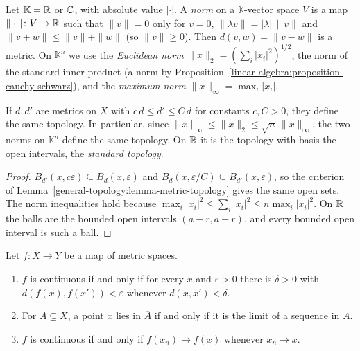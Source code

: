 \begin{definition}\label{general-topology:definition-normed-space}
Let $\mathbb{K} = \mathbb{R}$ or $\mathbb{C}$, with absolute value $|\cdot|$. A \emph{norm} on a $\mathbb{K}$-vector space $V$ is a map
$\| \cdot \| \colon V \to \mathbb{R}$ such that $\|v\| = 0$ only for $v = 0$, $\|\lambda v\| = |\lambda|\,\|v\|$ and $\|v + w\| \leq \|v\| + \|w\|$
(so $\|v\| \geq 0$). Then $d(v, w) = \|v - w\|$ is a metric. On $\mathbb{K}^n$ we use the \emph{Euclidean norm}
$\|x\|_2 = (\sum_i |x_i|^2)^{1/2}$, the norm of the standard inner product (a norm by
Proposition~\ref{linear-algebra:proposition-cauchy-schwarz}), and the \emph{maximum norm} $\|x\|_\infty = \max_i |x_i|$.
\end{definition}

\begin{lemma}\label{general-topology:lemma-equivalent-metrics}
If $d, d'$ are metrics on $X$ with $c\,d \leq d' \leq C\,d$ for constants $c, C > 0$, they define the same topology. In particular, since
$\|x\|_\infty \leq \|x\|_2 \leq \sqrt{n}\,\|x\|_\infty$, the two norms on $\mathbb{K}^n$ define the same topology. On $\mathbb{R}$ it is the topology with
basis the open intervals, the \emph{standard topology}.
\end{lemma}

\begin{proof}
$B_{d'}(x, c\varepsilon) \subseteq B_d(x, \varepsilon)$ and $B_d(x, \varepsilon/C) \subseteq B_{d'}(x, \varepsilon)$, so the criterion of
Lemma~\ref{general-topology:lemma-metric-topology} gives the same open sets. The norm inequalities hold because
$\max_i |x_i|^2 \leq \sum_i |x_i|^2 \leq n \max_i |x_i|^2$. On $\mathbb{R}$ the balls are the bounded open intervals $(a - r, a + r)$, and every bounded
open interval is such a ball.
\end{proof}

\begin{proposition}\label{general-topology:proposition-metric-continuity}
Let $f \colon X \to Y$ be a map of metric spaces.
\begin{enumerate}
\item $f$ is continuous if and only if for every $x$ and $\varepsilon > 0$ there is $\delta > 0$ with $d(f(x), f(x')) < \varepsilon$ whenever
$d(x, x') < \delta$.
\item For $A \subseteq X$, a point $x$ lies in $\overline{A}$ if and only if it is the limit of a sequence in $A$.
\item $f$ is continuous if and only if $f(x_n) \to f(x)$ whenever $x_n \to x$.
\end{enumerate}
\end{proposition}

